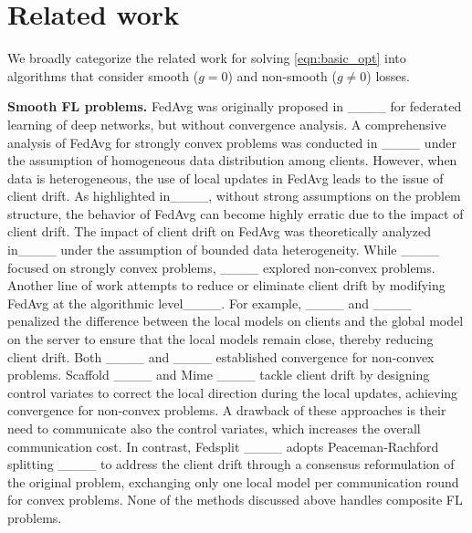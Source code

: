 \section{Related work}
We broadly categorize the related work for solving \eqref{eqn:basic_opt} into algorithms that consider smooth ($g=0$) and non-smooth ($g\neq 0$) losses.

{\bf  Smooth FL problems. }
FedAvg was originally proposed in ____ for federated
learning of deep networks, but without convergence analysis. A comprehensive analysis of FedAvg for strongly convex problems was conducted in ____ under the assumption of homogeneous data distribution among clients. %
However, when data is heterogeneous, the use of local updates in FedAvg leads to the issue of client drift. As highlighted in____, without strong assumptions on the problem structure, the behavior of FedAvg can become highly erratic due to the impact of client drift. 
The impact of client drift on FedAvg was theoretically analyzed in____ under the assumption of bounded data heterogeneity. While ____ focused on strongly convex problems,  ____ explored non-convex problems. 
%
Another line of work attempts to reduce or eliminate client drift by modifying FedAvg at the algorithmic level____.  
% 
{For example, ____ and ____ penalized the difference between the local models on clients and the global model on the server to ensure that the local models remain close, thereby reducing client drift. Both ____ and ____ established convergence for non-convex problems.} Scaffold ____ and Mime ____ tackle client drift by designing control variates to correct the local direction during the local updates, achieving convergence for non-convex problems.  
%
A drawback of these approaches is their need to communicate also the control variates, which increases the overall communication cost.  
%
In contrast, Fedsplit ____ adopts Peaceman-Rachford splitting ____ to address the client drift through a consensus reformulation of the original problem, exchanging only one local model per communication round for convex problems.
%
None of the methods discussed above handles composite FL problems.


